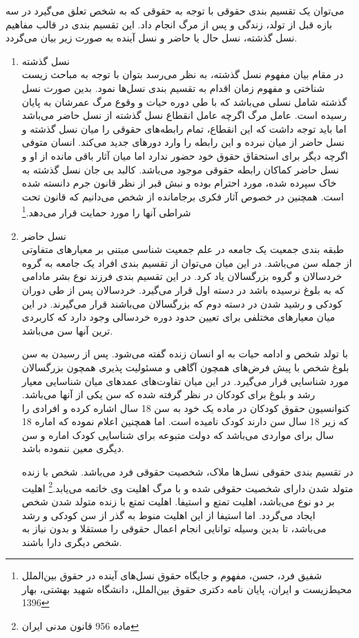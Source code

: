 		
		می‌توان یک تقسیم بندی حقوقی با توجه به حقوقی که به شخص تعلق می‌گیرد در سه بازه قبل از تولد، زندگی و پس از مرگ انجام داد. این تقسیم بندی در قالب مفاهیم نسل گذشته، نسل حال یا حاضر و نسل آینده به صورت زیر بیان می‌گردد. 
			\begin{enumerate}
				\item نسل گذشته\\
				در مقام بیان مفهوم نسل گذشته، به نظر می‌رسد بتوان با توجه به مباحث زیست شناختی و مفهوم زمان اقدام به تقسیم بندی نسل‌ها نمود. بدین صورت نسل گذشته شامل نسلی می‌باشد که با طی دوره حیات و وقوع مرگ عمرشان به پایان رسیده است.  عامل مرگ اگرچه عامل انقطاع نسل گذشته از نسل حاضر می‌باشد اما باید توجه داشت که این انقطاع، تمام رابطه‌های حقوقی را میان نسل گذشته و نسل حاضر از میان نبرده و این رابطه را وارد دورهای جدید می‌کند. انسان متوفی اگرچه دیگر برای استحقاق حقوق خود حضور ندارد  اما میان آثار باقی مانده از او و نسل حاضر کماکان رابطه حقوقی موجود می‌باشد. کالبد بی جان نسل گذشته به خاک سپرده شده، مورد احترام بوده و نبش قبر از نظر قانون جرم دانسته شده است. همچنین در خصوص آثار فکری برجامانده از شخص می‌دانیم که قانون تحت شراطی آنها را مورد حمایت قرار می‌دهد.\footnote{شفیق فرد، حسن، مفهوم و جایگاه حقوق نسل‌های آینده در حقوق بین‌الملل  محیط‌زیست و ایران، پایان نامه دکتری حقوق بین‌الملل، دانشگاه شهید بهشتی، بهار 1396}
				\item نسل حاضر\\
					طبقه بندی جمعیت یک جامعه در علم جمعیت شناسی مبتنی بر معیار‌های متفاوتی از جمله سن می‌باشد. در این میان می‌توان از تقسیم بندی افراد یک جامعه به گروه خردسالان و گروه بزرگسالان یاد کرد. در این تقسیم بندی فرزند نوع بشر مادامی که به بلوغ نرسیده باشد در دسته اول قرار می‌گیرد. خرد‌سالان پس از طی دوران کودکی و رشید شدن در دسته دوم که بزرگسالان می‌باشند قرار می‌گیرند. در این میان معیارهای مختلفی برای تعیین حدود دوره خردسالی وجود دارد که کاربردی ترین آنها سن می‌باشد. 
					
					با تولد شخص و ادامه حیات به او انسان زنده گفته می‌شود. پس از رسیدن به سن بلوغ شخص با پیش فرض‌های همچون آگاهی و مسئولیت پذیری همچون بزرگسالان مورد شناسایی قرار می‌گیرد. در این میان تفاوت‌های عمدهای میان شناسایی معیار رشد و بلوغ برای کودکان در نظر گرفته شده که سن یکی از آنها می‌باشد. کنوانسیون حقوق کودکان در ماده یک خود به سن 18 سال اشاره کرده و افرادی را که زیر 18 سال سن دارند کودک نامیده است. اما همچنین اعلام نموده که اماره 18 سال برای مواردی می‌باشد که دولت متبوعه برای شناسایی کودک اماره و سن دیگری معین ننموده باشد. 
					
				در تقسیم بندی حقوقی نسل‌ها ملاک، شخصیت حقوقی فرد می‌باشد. شخص با زنده متولد شدن دارای شخصیت حقوقی شده و با مرگ اهلیت وی خاتمه می‌یابد.\footnote{ماده 956 قانون مدنی ایران} اهلیت بر دو نوع می‌باشد، اهلیت تمتع و استیفا. اهلیت تمتع با زنده متولد شدن شخص ایجاد می‌گردد. اما استیفا از این اهلیت منوط به گذر از سن کودکی و رشد می‌باشد، تا بدین وسیله توانایی انجام اعمال حقوقی را مستقلا و بدون نیاز به شخص دیگری دارا باشند. 
				

\end{enumerate}
